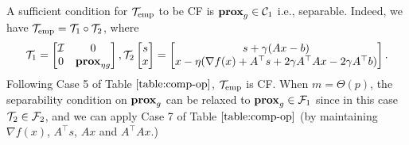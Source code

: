 {{\begin{remark}
\end{remark}
A sufficient condition for ${\mathcal{T}}_\textnormal{emp}$  to be CF is $\mathbf{prox}_g\in{\mathcal{C}}_1$ i.e., separable. Indeed, we have ${\mathcal{T}}_\textnormal{emp}={\mathcal{T}}_1\circ{\mathcal{T}}_2$, where $$\cT_1=\begin{bmatrix}
\cI & 0\\0&\prox_{\eta g}
\end{bmatrix}, \cT_2\begin{bmatrix}
s\\x
\end{bmatrix}=\begin{bmatrix}
s+\gamma (Ax-b)\\
x-\eta(\nabla f(x)+A^\top s+2\gamma A^\top Ax-2\gamma A^\top b)
\end{bmatrix}.$$
  Following Case 5 of Table $\ref{table:comp-op}$, ${\mathcal{T}}_\textnormal{emp}$ is CF. When  $m=\Theta(p)$, the separability condition on $\mathbf{prox}_g$ can be relaxed to $\mathbf{prox}_g\in{\mathcal{F}}_1$ since in this case ${\mathcal{T}}_2\in{\mathcal{F}}_2$, and we can apply  Case 7 of Table $\ref{table:comp-op}$ (by maintaining $\nabla f(x)$, $A^\top s$, $Ax$ and $A^\top Ax$.)
}}
